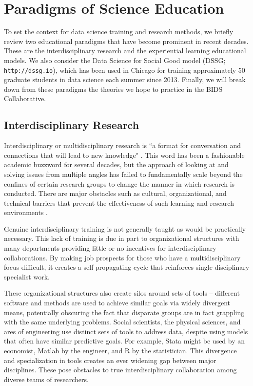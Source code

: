 \documentclass[12pt]{article}
\begin{document}
\section{Paradigms of Science Education}

To set the context for data science training and research methods, we briefly review two educational paradigms that have become prominent in recent decades. These are the interdisciplinary research and the experiential learning educational models. We also consider the Data Science for Social Good model (DSSG; \texttt{http://dssg.io}), which has been used in Chicago for training approximately 50 graduate students in data science each summer since 2013. Finally, we will break down from these paradigms the theories we hope to practice in the BIDS Collaborative.

\subsection{Interdisciplinary Research}

Interdisciplinary or multidisciplinary research is ``a format for conversation and connections that will lead to new knowledge" \citep{repko2008interdisciplinary}. This word has been a fashionable academic buzzword for several decades, but the approach of looking at and solving issues from multiple angles has failed to fundamentally scale beyond the confines of certain research groups to change the manner in which research is conducted. There are major obstacles such as cultural, organizational, and technical barriers that prevent the effectiveness of such learning and research environments \citep{eisenberg2000bridging}.

Genuine interdisciplinary training is not generally taught as would be practically necessary.  This lack of training is due in part to organizational structures with many departments providing little or no incentives for interdisciplinary collaborations. By making job prospects for those who have a multidisciplinary focus difficult, it creates a self-propagating cycle that reinforces single disciplinary specialist work. 

These organizational structures also create silos around sets of tools -- different software and methods are used to achieve similar goals via widely divergent means, potentially obscuring the fact that disparate groups are in fact grappling with the same underlying problems. Social scientists, the physical sciences, and ares of engineering use distinct sets of tools to address data, despite using models that often have similar predictive goals. For example, Stata \citep{stata2005stata} might be used by an economist, Matlab \citep{incorporation2005matlab} by the engineer, and R \citep{RCoreTeam2014} by the statistician. This divergence and specialization in tools creates an ever widening gap between major disciplines.  These pose obstacles to true interdisciplinary collaboration among diverse teams of researchers.
\end{document}
